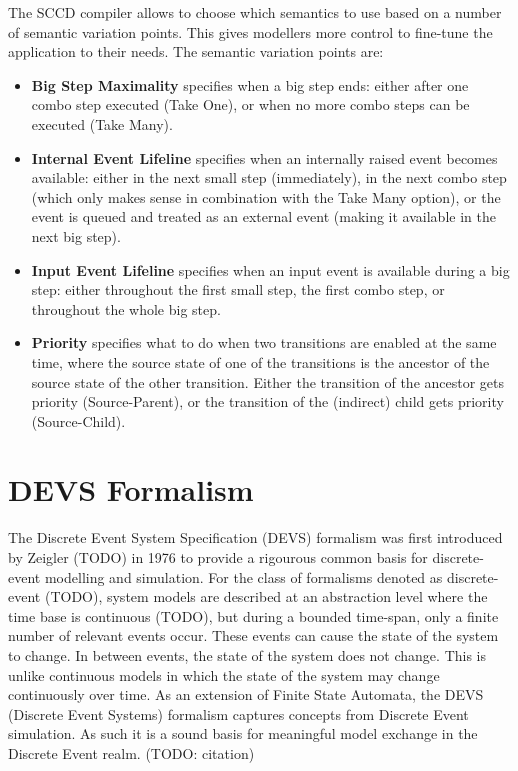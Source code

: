 The SCCD compiler allows to choose which semantics to use based on a number of semantic variation points. This gives modellers 
more control to fine-tune the application to their needs. The semantic variation points are:
\begin{itemize}
    \item \textbf{Big Step Maximality} specifies when a big step ends: either after one combo step executed (Take One), or when 
    no more combo steps can be executed (Take Many).
    \item \textbf{Internal Event Lifeline} specifies when an internally raised event becomes available: either in the next small 
    step (immediately), in the next combo step (which only makes sense in combination with the Take Many option), or the event is 
    queued and treated as an external event (making it available in the next big step).
    \item \textbf{Input Event Lifeline} specifies when an input event is available during a big step: either throughout the first 
    small step, the first combo step, or throughout the whole big step.
    \item \textbf{Priority} specifies what to do when two transitions are enabled at the same time, where the source state of one 
    of the transitions is the ancestor of the source state of the other transition. Either the transition of the ancestor gets 
    priority (Source-Parent), or the transition of the (indirect) child gets priority (Source-Child).
\end{itemize}


\section{DEVS Formalism}
The Discrete Event System Specification (DEVS)
formalism was first introduced by Zeigler (TODO) in 1976 to provide a rigourous common basis for discrete-event modelling and 
simulation. For the class of formalisms denoted as discrete-event (TODO), system models are described at an abstraction 
level where the time base is continuous (TODO), but during a bounded time-span, only a finite number of relevant events 
occur. These events can cause the state of the system to change. In between events, the state of the system does not 
change. This is unlike continuous models in which the state of the system may change continuously over time. As an 
extension of Finite State Automata, the DEVS (Discrete Event Systems) formalism captures concepts from Discrete Event 
simulation. As such it is a sound basis for meaningful model exchange in the Discrete Event realm. (TODO: citation)

